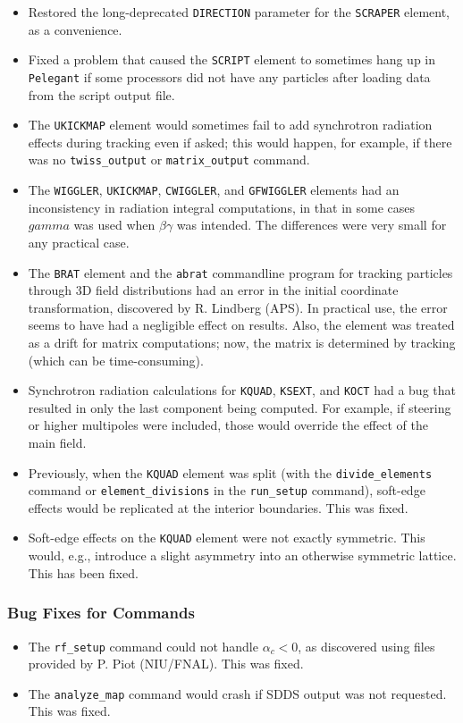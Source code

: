 \documentclass[11pt]{article}
\begin{document}
\begin{itemize}
\item Restored the long-deprecated \verb|DIRECTION| parameter for the \verb|SCRAPER| element, as a convenience.
\item Fixed a problem that caused the \verb|SCRIPT| element to sometimes hang up in \verb|Pelegant| if some processors 
  did not have any particles after loading data from the script output file.
\item The \verb|UKICKMAP| element would sometimes fail to add synchrotron radiation effects during tracking even if asked; this would
  happen, for example, if there was no \verb|twiss_output| or \verb|matrix_output| command.
\item The \verb|WIGGLER|, \verb|UKICKMAP|, \verb|CWIGGLER|, and \verb|GFWIGGLER| elements had an inconsistency in radiation
  integral computations, in that in some cases $gamma$ was used when $\beta\gamma$ was intended. The differences were very
  small for any practical case.
\item The \verb|BRAT| element and the \verb|abrat| commandline program for tracking particles through 3D field distributions
  had an error in the initial coordinate transformation, discovered by R. Lindberg (APS). In practical use, the error seems
  to have had a negligible effect on results.
  Also, the element was treated as a drift for matrix computations; now, the matrix is determined by tracking (which can
  be time-consuming).
\item Synchrotron radiation calculations for \verb|KQUAD|, \verb|KSEXT|, and \verb|KOCT| had a bug that resulted in only
  the last component being computed. For example, if steering or higher multipoles were included, those would override 
  the effect of the main field.
\item Previously, when the \verb|KQUAD| element was split (with the \verb|divide_elements| command or
  \verb|element_divisions| in the \verb|run_setup| command), soft-edge effects would be replicated at the
  interior boundaries. This was fixed.
\item Soft-edge effects on the \verb|KQUAD| element were not exactly symmetric. This would, e.g., introduce a slight
  asymmetry into an otherwise symmetric lattice. This has been fixed.
\end{itemize}

\subsubsection{Bug Fixes for Commands}
\begin{itemize}
\item The \verb|rf_setup| command could not handle $\alpha_c<0$, as discovered using files provided by P. Piot (NIU/FNAL).
  This was fixed.
\item The \verb|analyze_map| command would crash if SDDS output was not requested. This was fixed.
\end{itemize}
\end{document}
